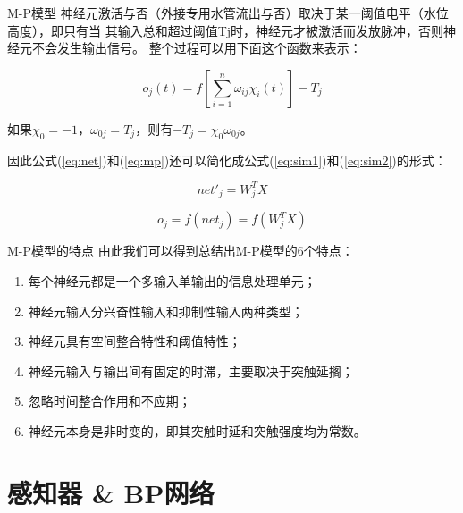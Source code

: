 \documentclass[xcolor=svgnames]{beamer}
\begin{document}
\begin{frame}{M-P模型}
  神经元激活与否（外接专用水管流出与否）取决于某一阈值电平（水位高度），即只有当
  其输入总和超过阈值Tj时，神经元才被激活而发放脉冲，否则神经元不会发生输出信号。
  整个过程可以用下面这个函数来表示：
  
  \begin{equation}
  \label{eq:mp}
    o_{j}(t) = f{[\sum_{i=1}^n\omega_{ij}\chi_{i}(t)]-T_{j}}
  \end{equation}
\end{frame}

\begin{frame}{}
  如果\(\chi_0 = -1\)，\(\omega_{0j} = T_j\)，则有\(-T_j = \chi_0\omega_{0j}\)。
  
  因此公式(\ref{eq:net})和(\ref{eq:mp})还可以简化成公式(\ref{eq:sim1})和(\ref{eq:sim2})的形式：

  \begin{equation}
    \label{eq:sim1}
    net'_j = W_j^TX
  \end{equation}

  \begin{equation}
    \label{eq:sim2}
    o_j = f(net_j) = f(W_j^TX)
  \end{equation}
\end{frame}


\begin{frame}{M-P模型的特点}
  由此我们可以得到总结出M-P模型的6个特点：
  \begin{enumerate}
  \item 每个神经元都是一个\alert{多输入单输出}的信息处理单元；
  \item 神经元输入分\alert{兴奋性输入}和\alert{抑制性}输入两种类型；
  \item 神经元具有\alert{空间整合特性}和\alert{阈值特性}；
  \item 神经元输入与输出间有固定的\alert{时滞}，主要取决于突触延搁；
  \item \alert{忽略}时间整合作用和不应期；
  \item 神经元本身是\alert{非时变}的，即其突触时延和突触强度均为常数。
  \end{enumerate}
\end{frame}

\section{感知器 \& BP网络}
\label{sec:perceptron}
\end{document}
